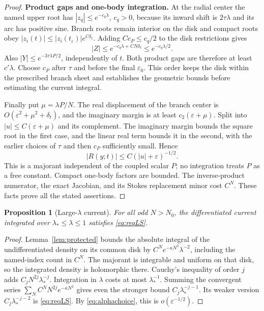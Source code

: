 \documentclass[11pt]{article}
\numberwithin{equation}{section}
\newtheorem{proposition}[theorem]{Proposition}
\theoremstyle{definition}
\newcommand{\eps}{\varepsilon}
\begin{document}
\begin{proof}
\par\smallskip\noindent\textbf{Product gaps and one-body integration.} At the radial center the named upper root has
\(|z_q|\le e^{-c_q\lambda}\), \(c_q>0\), because its inward
shift is \(2\tau\lambda\) and its arc has positive sine.
Branch roots remain interior on the disk and compact roots obey
\(|z_i(t)|\le |z_i(t_\eps)|e^{C\delta_t}\).
Adding \(Cc_P\le c_q/2\) to the disk restrictions gives
\[
 |Z|\le e^{-c_q\lambda+CN\delta_t}\le e^{-c_q\lambda/2}.
\]
Also \(|Y|\le e^{-3\tau\lambda P/2}\), independently of \(t\).
Both product gaps are therefore at least \(c'\lambda\).
Choose \(c_P\) after \(\tau\) and before the final \(\eps_0\).
This order keeps the disk within the prescribed branch sheet and
establishes the geometric bounds before estimating the current integral.

Finally put \(\mu=\lambda P/N\). The real displacement of the
branch center is \(O(\eps^2+\mu^2+\delta_t)\), and the imaginary
margin is at least \(c_2(\eps+\mu)\).
Split into \(|u|\le C(\eps+\mu)\) and its complement.
The imaginary margin bounds the square root in the first
case, and the linear real term bounds it in the second, with
the earlier choices of \(\tau\) and then \(c_P\) sufficiently small. Hence
\[
 |R(y;t)|\le C(|u|+\eps)^{-1/2}.
\]
This is a majorant independent of the coupled scalar \(P\);
no integration treats \(P\) as a free constant. Compact
one-body factors are bounded. The inverse-product numerator,
the exact Jacobian, and its Stokes replacement minor cost
\(C^N\). These facts prove all the stated assertions.
\end{proof}

\begin{proposition}[Large-\(\lambda\) current]\label{prop:largeS}
For all odd $N>N_0$, the differentiated current integrated over
\(\lambda_*\le\lambda\le1\) satisfies \eqref{eq:reqLS}.
\end{proposition}
\begin{proof}
Lemma~\ref{lem:protected} bounds the absolute integral of
the undifferentiated density on its common disk by
\(C^Ne^{-\kappa N^2}\lambda^{-2}\), including the named-index
count in \(C^N\). The majorant is integrable and uniform on
that disk, so the integrated density is holomorphic there.
Cauchy's inequality of order \(j\) adds
\(C_jN^{2j}\lambda_*^{-j}\). Integration in \(\lambda\) costs
at most \(\lambda_*^{-1}\). Summing the convergent series
\(\sum_N C^NN^{2j}e^{-\kappa N^2}\) gives even the stronger
bound \(C_j\lambda_*^{-j-1}\). Its weaker version
\(C_j\lambda_*^{-j-2}\) is \eqref{eq:reqLS}.
By \eqref{eq:alphachoice}, this is \(o(\eps^{-1/2})\).
\end{proof}
\end{document}
